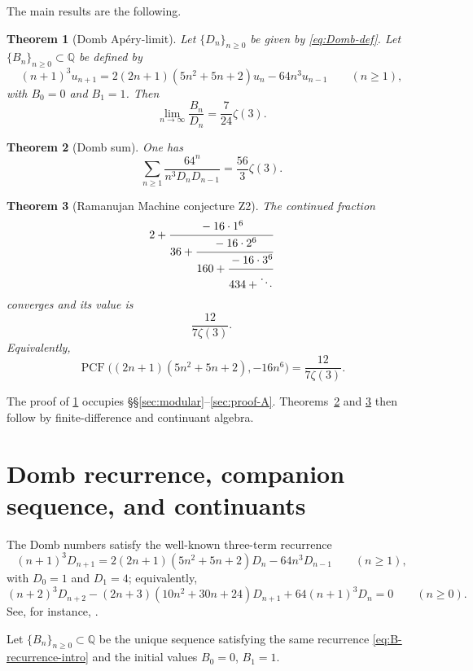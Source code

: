 \documentclass[11pt]{amsart}
\newtheorem{theorem}{Theorem}[section]
\theoremstyle{definition}
\theoremstyle{remark}
\newcommand{\Q}{\mathbb{Q}}
\DeclareMathOperator{\PCF}{PCF}
\begin{document}
The main results are the following.

\begin{theorem}[Domb Apéry-limit]\label{thm:A}
Let $\{D_n\}_{n\ge 0}$ be given by \eqref{eq:Domb-def}. Let $\{B_n\}_{n\ge 0}\subset\Q$ be defined by
\begin{equation}\label{eq:B-recurrence-intro}
(n+1)^3u_{n+1}=2(2n+1)(5n^2+5n+2)u_n-64n^3u_{n-1}
\qquad(n\ge 1),
\end{equation}
with $B_0=0$ and $B_1=1$. Then
\[
\lim_{n\to\infty}\frac{B_n}{D_n}=\frac{7}{24}\zeta(3).
\]
\end{theorem}

\begin{theorem}[Domb sum]\label{thm:C}
One has
\[
\sum_{n\ge 1}\frac{64^n}{n^3D_nD_{n-1}}=\frac{56}{3}\zeta(3).
\]
\end{theorem}

\begin{theorem}[Ramanujan Machine conjecture Z2]\label{thm:B}
The continued fraction
\[
2+\cfrac{-16\cdot 1^6}{36+\cfrac{-16\cdot 2^6}{160+\cfrac{-16\cdot 3^6}{434+\ddots}}}
\]
converges and its value is
\[
\frac{12}{7\zeta(3)}.
\]
Equivalently,
\[
\PCF\bigl((2n+1)(5n^2+5n+2),-16n^6\bigr)=\frac{12}{7\zeta(3)}.
\]
\end{theorem}

The proof of \cref{thm:A} occupies \S\S\ref{sec:modular}--\ref{sec:proof-A}. Theorems~\ref{thm:C} and \ref{thm:B} then follow by finite-difference and continuant algebra.

\section{Domb recurrence, companion sequence, and continuants}\label{sec:recurrence}

The Domb numbers satisfy the well-known three-term recurrence
\begin{equation}\label{eq:Domb-rec}
(n+1)^3D_{n+1}=2(2n+1)(5n^2+5n+2)D_n-64n^3D_{n-1}
\qquad(n\ge 1),
\end{equation}
with $D_0=1$ and $D_1=4$; equivalently,
\begin{equation}\label{eq:Domb-rec-shifted}
(n+2)^3D_{n+2}-(2n+3)(10n^2+30n+24)D_{n+1}+64(n+1)^3D_n=0
\qquad(n\ge 0).
\end{equation}
See, for instance, \cite[Table~2, case $6(B)$]{Cooper2023}.

Let $\{B_n\}_{n\ge 0}\subset\Q$ be the unique sequence satisfying the same recurrence \eqref{eq:B-recurrence-intro} and the initial values $B_0=0$, $B_1=1$.
\end{document}
